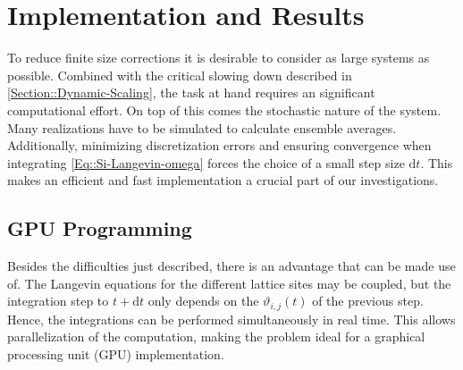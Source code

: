 	\chapter{Implementation and Results} \label{Chapter::Implementation-Results}
	To reduce finite size corrections it is desirable to consider as large systems as possible. Combined with the critical slowing down described in  \autoref{Section::Dynamic-Scaling}, the task at hand requires an significant computational effort. On top of this comes the stochastic nature of the system. Many realizations have to be simulated to calculate ensemble averages. Additionally, minimizing discretization errors and ensuring convergence when integrating \eqref{Eq::Si-Langevin-omega} forces the choice of a small step size $\text{d}t$. This makes an efficient and fast implementation a crucial part of our investigations.
	\section{GPU Programming}
	Besides the difficulties just described, there is an advantage that can be made use of. The Langevin equations for the different lattice sites may be coupled, but the integration step to $t + \text{d}t$ only depends on the $\vartheta_{i, j}(t)$ of the previous step. Hence, the integrations can be performed simultaneously in real time. This allows parallelization of the computation, making the problem ideal for a graphical processing unit (GPU) implementation. \\
	
